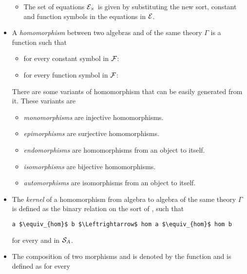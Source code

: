 \begin{itemize}
\begin{itemize}
    \item The set of equations $\mathcal{E}_\times$ is given by substituting the new sort, constant and function symbols in the equations in $\mathcal{E}$.  
    \end{itemize}
    \item A \emph{homomorphism} between two algebras  and  of the same theory $\Gamma$ is a function  such that 
    \begin{itemize}
        \item for every constant symbol  in $\mathcal{F}$:  
        \item for every function symbol  in $\mathcal{F}$: \newline 
           \-\hspace{2em} 
    \end{itemize}
    There are some variants of homomorphism that can be easily generated from it. These variants are  
    \begin{itemize}
    	\item \emph{monomorphisms} are injective homomorphisms. 
  	  	\item \emph{epimorphisms} are surjective homomorphisms. 
    	\item \emph{endomorphisms} are homomorphisms from an object to itself. 
    	\item \emph{isomorphisms} are bijective homomorphisms. 
    	\item \emph{automorphisms} are isomorphisms from an object to itself. 
    \end{itemize}
    \item The \emph{kernel} of a homomorphism from algebra  to algebra  of the same theory $\Gamma$ is defined as the binary relation  on the sort of , such that 
    \begin{lstlisting}[mathescape] 
    a $\equiv_{hom}$ b $\Leftrightarrow$ hom a $\equiv_{hom}$ hom b
    \end{lstlisting}
    for every  and  in $\mathcal{S}_A$. 
    \item The composition of two morphisms  and  is denoted by the function  and is defined as 
     for every    

\end{itemize}
